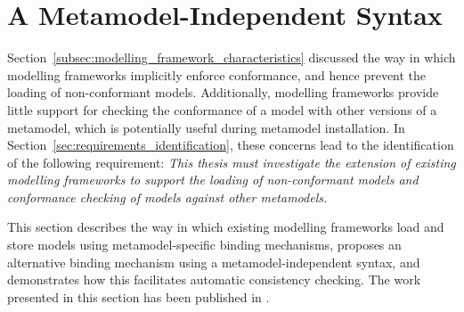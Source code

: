 


\section{A Metamodel-Independent Syntax}
\label{sec:mmi_syntax}
Section~\ref{subsec:modelling_framework_characteristics} discussed the way in which modelling frameworks implicitly enforce conformance, and hence prevent the loading of non-conformant models. Additionally, modelling frameworks provide little support for checking the conformance of a model with other versions of a metamodel, which is potentially useful during metamodel installation. In Section~\ref{sec:requirements_identification}, these concerns lead to the identification of the following requirement: \emph{This thesis must investigate the extension of existing modelling frameworks to support the loading of non-conformant models and conformance checking of models against other metamodels.}

This section describes the way in which existing modelling frameworks load and store models using metamodel-specific binding mechanisms, proposes an alternative binding mechanism using a metamodel-independent syntax, and demonstrates how this facilitates automatic consistency checking. The work presented in this section has been published in \cite{rose09enhanced}.

